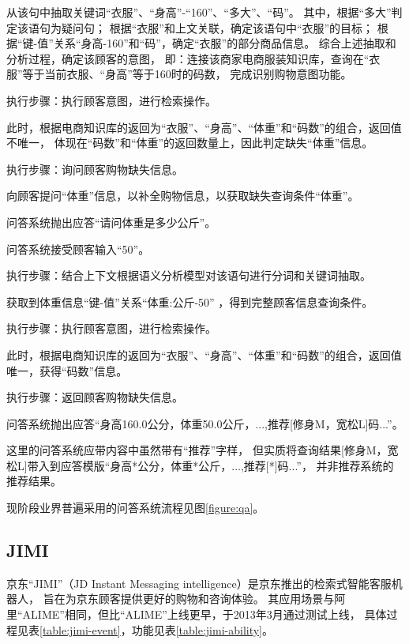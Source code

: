 从该句中抽取关键词“衣服”、“身高”-“160”、“多大”、“码”。
其中，根据“多大”判定该语句为疑问句；
根据“衣服”和上文关联，确定该语句中“衣服”的目标；
根据“键-值”关系“身高-160”和“码”，确定“衣服”的部分商品信息。
综合上述抽取和分析过程，确定该顾客的意图，
即：连接该商家电商服装知识库，查询在“衣服”等于当前衣服、“身高”等于160时的码数，
完成识别购物意图功能。

执行步骤：执行顾客意图，进行检索操作。

此时，根据电商知识库的返回为“衣服”、“身高”、“体重”和“码数”的组合，返回值不唯一，
体现在“码数”和“体重”的返回数量上，因此判定缺失“体重”信息。

执行步骤：询问顾客购物缺失信息。

向顾客提问“体重”信息，以补全购物信息，以获取缺失查询条件“体重”。

\textbullet{}问答系统抛出应答“请问体重是多少公斤”。

\textbullet{}问答系统接受顾客输入“50”。

执行步骤：结合上下文根据语义分析模型对该语句进行分词和关键词抽取。

获取到体重信息“键-值”关系“\mbox{体重}:\mbox{公斤}-50”
，得到完整顾客信息查询条件。

执行步骤：执行顾客意图，进行检索操作。

此时，根据电商知识库的返回为“衣服”、“身高”、“体重”和“码数”的组合，返回值唯一，获得“码数”信息。

执行步骤：返回顾客购物缺失信息。

\textbullet{}问答系统抛出应答“身高160.0公分，体重50.0公斤，...,推荐[修身M，宽松L]码...”。

这里的问答系统应带内容中虽然带有“推荐”字样，
但实质将查询结果[修身M，宽松L]带入到应答模版“身高*公分，体重*公斤，...,推荐[*]码...”，
并非推荐系统的推荐结果。



现阶段业界普遍采用的问答系统流程见图\ref{figure:qa}。

\subsection{JIMI}
\label{subsection:jimi}
京东“JIMI”（JD Instant Messaging intelligence）是京东推出的检索式智能客服机器人，
旨在为京东顾客提供更好的购物和咨询体验。
其应用场景与阿里“ALIME”相同，但比“ALIME”上线更早，于2013年3月通过测试上线，
具体过程见表\ref{table:jimi-event}，功能见表\ref{table:jimi-ability}。




